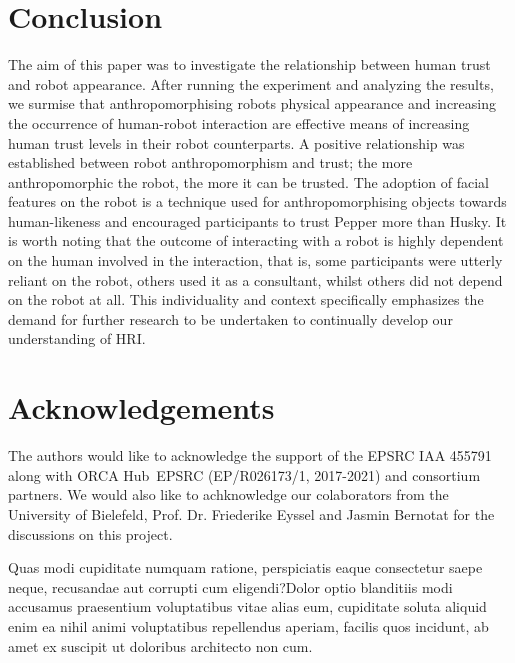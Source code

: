 \documentclass[letterpaper]{article} %
\begin{document}
\section{Conclusion}
The aim of this paper was to investigate the relationship between human trust and robot appearance. After running the experiment and analyzing the results, we surmise that anthropomorphising robots physical appearance and increasing the occurrence of human-robot interaction are effective means of increasing human trust levels in their robot counterparts. A positive relationship was established between robot anthropomorphism and trust; the more anthropomorphic the robot, the more it can be trusted. The adoption of facial features on the robot is a technique used for anthropomorphising objects towards human-likeness and encouraged participants to trust Pepper more than Husky. It is worth noting that the outcome of interacting with a robot is highly dependent on the human involved in the interaction, that is, some participants were utterly reliant on the robot, others used it as a consultant, whilst others did not depend on the robot at all. This individuality and context specifically emphasizes the demand for further research to be undertaken to continually develop our understanding of HRI.
\section{Acknowledgements}
The authors would like to acknowledge the support of the EPSRC IAA 455791 along with ORCA Hub~EPSRC (EP/R026173/1, 2017-2021) and consortium partners. We would also like to achknowledge our colaborators from the University of Bielefeld, Prof. Dr. Friederike Eyssel and Jasmin Bernotat for the discussions on this project.

Quas modi cupiditate numquam ratione, perspiciatis eaque consectetur saepe neque, recusandae aut corrupti cum eligendi?Dolor optio blanditiis modi accusamus praesentium voluptatibus vitae alias eum, cupiditate soluta aliquid enim ea nihil animi voluptatibus repellendus aperiam, facilis quos incidunt, ab amet ex suscipit ut doloribus architecto non cum.\clearpage

\end{document}
